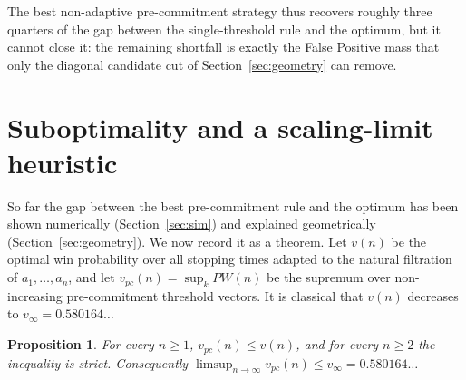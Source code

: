 \documentclass[11pt]{article}
\newtheorem{proposition}{Proposition}
\begin{document}
The best non-adaptive pre-commitment strategy thus recovers roughly three quarters of
the gap between the single-threshold rule and the optimum, but it cannot close it: the
remaining shortfall is exactly the False Positive mass that only the diagonal candidate
cut of Section~\ref{sec:geometry} can remove.

\section{Suboptimality and a scaling-limit heuristic}\label{sec:subopt}

So far the gap between the best pre-commitment rule and the optimum has been shown
numerically (Section~\ref{sec:sim}) and explained geometrically
(Section~\ref{sec:geometry}). We now record it as a theorem. Let $v(n)$ be the optimal
win probability over all stopping times adapted to the natural filtration of
$a_1,\dots,a_n$, and let $v_{pc}(n)=\sup_k PW(n)$ be the supremum over non-increasing
pre-commitment threshold vectors. It is classical that $v(n)$ decreases to
$v_\infty=0.580164\ldots$

\begin{proposition}\label{prop:subopt}
For every $n\ge 1$, $v_{pc}(n)\le v(n)$, and for every $n\ge 2$ the inequality is strict.
Consequently $\limsup_{n\to\infty} v_{pc}(n)\le v_\infty=0.580164\ldots$
\end{proposition}
\end{document}
